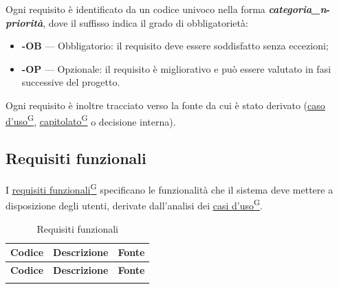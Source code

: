 ﻿\documentclass[a4paper,12pt]{article}
\providecommand{\glslink}[2]{\href{https://alittlebyte-19.github.io/Documentazione/glossario.html\#gls-#1}{\underline{#2}\textsuperscript{\scriptsize G}}}
\begin{document}
\begin{description}[style=multiline, leftmargin=4cm, font=\bfseries]
\begin{enumerate}[leftmargin=*, nosep]
Ogni requisito è identificato da un codice univoco nella forma \textbf{\textit{categoria\_n}-\textit{priorità}}, dove il suffisso indica il grado di obbligatorietà:
\begin{itemize}
    \item \textbf{-OB} — Obbligatorio: il requisito deve essere soddisfatto senza eccezioni;
    \item \textbf{-OP} — Opzionale: il requisito è migliorativo e può essere valutato in fasi successive del progetto.
\end{itemize}

Ogni requisito è inoltre tracciato verso la fonte da cui è stato derivato (\glslink{caso-d-uso-uc}{caso d'uso}, \glslink{capitolato}{capitolato} o decisione interna).

\subsection{Requisiti funzionali}

I \glslink{requisiti-funzionali}{requisiti funzionali} specificano le funzionalità che il sistema deve mettere a disposizione degli utenti, derivate dall'analisi dei \glslink{caso-d-uso-uc}{casi d'uso}.

\vspace{0.4cm}
{\small
\renewcommand{\arraystretch}{1.3}
\begin{longtable}{|p{2.5cm}|p{9.5cm}|p{3.5cm}|}
    \caption{Requisiti funzionali} \label{tab:rf} \\
    \hline
    \rowcolor{gray!20}
    \textbf{Codice} & \textbf{Descrizione} & \textbf{Fonte} \\
    \hline
    \endfirsthead
    \hline
    \rowcolor{gray!20}
    \textbf{Codice} & \textbf{Descrizione} & \textbf{Fonte} \\
    \hline
    \endhead
    \hline
    \endfoot
    \hline
    \endlastfoot


\end{longtable}}
\end{enumerate}
\end{description}
\end{document}
